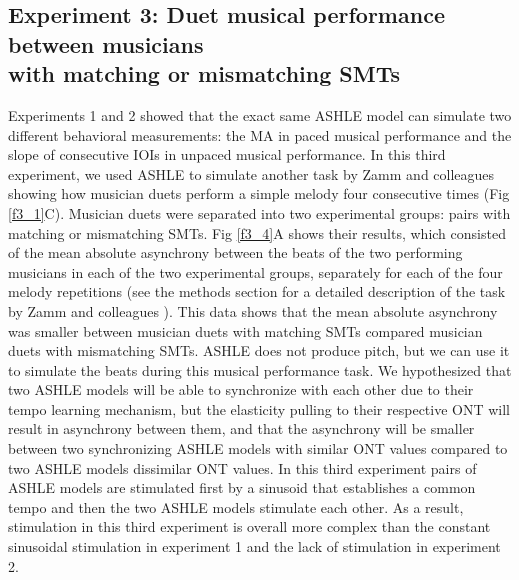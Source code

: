 \documentclass{report}
\begin{document}
\subsection{Experiment 3: Duet musical performance between musicians \\ with matching or mismatching SMTs}

Experiments 1 and 2 showed that the exact same ASHLE model can simulate two different behavioral measurements: the MA in paced musical performance and the slope of consecutive IOIs in unpaced musical performance. In this third experiment, we used ASHLE to simulate another task by Zamm and colleagues \cite{zamm2016endogenous} showing how musician duets perform a simple melody four consecutive times (Fig \ref{f3_1}C). Musician duets were separated into two experimental groups: pairs with matching or mismatching SMTs. Fig \ref{f3_4}A shows their results, which consisted of the mean absolute asynchrony between the beats of the two performing musicians in each of the two experimental groups, separately for each of the four melody repetitions (see the methods section for a detailed description of the task by Zamm and colleagues \cite{zamm2016endogenous}). This data shows that the mean absolute asynchrony was smaller between musician duets with matching SMTs compared musician duets with mismatching SMTs. ASHLE does not produce pitch, but we can use it to simulate the beats during this musical performance task. We hypothesized that two ASHLE models will be able to synchronize with each other due to their tempo learning mechanism, but the elasticity pulling to their respective ONT will result in asynchrony between them, and that the asynchrony will be smaller between two synchronizing ASHLE models with similar ONT values compared to two ASHLE models dissimilar ONT values. In this third experiment pairs of ASHLE models are stimulated first by a sinusoid that establishes a common tempo and then the two ASHLE models stimulate each other. As a result, stimulation in this third experiment is overall more complex than the constant sinusoidal stimulation in experiment 1 and the lack of stimulation in experiment 2.
\end{document}
